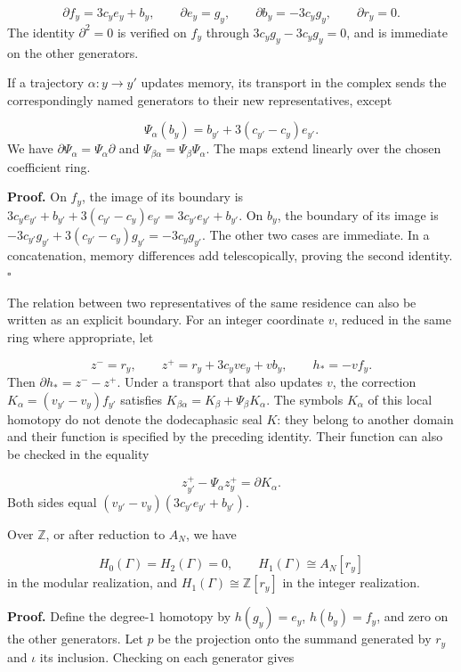 \[
\partial f_y=3c_y e_y+b_y,\qquad
\partial e_y=g_y,\qquad
\partial b_y=-3c_y g_y,\qquad
\partial r_y=0.
\]
The identity \(\partial^2=0\) is verified on \(f_y\) through \(3c_yg_y-3c_yg_y=0\), and is immediate on the other generators.

If a trajectory \(\alpha:y\to y'\) updates memory, its transport in the complex sends the correspondingly named generators to their new representatives, except

\[
\Psi_\alpha(b_y)=b_{y'}+3(c_{y'}-c_y)e_{y'}.
\]
We have \(\partial\Psi_\alpha=\Psi_\alpha\partial\) and \(\Psi_{\beta\alpha}=\Psi_\beta\Psi_\alpha\). The maps extend linearly over the chosen coefficient ring.

\textbf{Proof.} On \(f_y\), the image of its boundary is \(3c_ye_{y'}+b_{y'}+3(c_{y'}-c_y)e_{y'} =3c_{y'}e_{y'}+b_{y'}\). On \(b_y\), the boundary of its image is \(-3c_{y'}g_{y'}+3(c_{y'}-c_y)g_{y'}=-3c_yg_{y'}\). The other two cases are immediate. In a concatenation, memory differences add telescopically, proving the second identity. \hfill\(\square\)

The relation between two representatives of the same residence can also be written as an explicit boundary. For an integer coordinate \(v\), reduced in the same ring where appropriate, let

\[
z^-=r_y,\qquad z^+=r_y+3c_yv e_y+v b_y,
\qquad h_*=-vf_y.
\]
Then \(\partial h_*=z^--z^+\). Under a transport that also updates \(v\), the correction \(K_\alpha=(v_{y'}-v_y)f_{y'}\) satisfies \(K_{\beta\alpha}=K_\beta+\Psi_\beta K_\alpha\). The symbols \(K_\alpha\) of this local homotopy do not denote the dodecaphasic seal \(K\): they belong to another domain and their function is specified by the preceding identity. Their function can also be checked in the equality

\[
z^+_{y'}-\Psi_\alpha z^+_y=\partial K_\alpha.
\]
Both sides equal \((v_{y'}-v_y)(3c_{y'}e_{y'}+b_{y'})\).

Over \(\mathbb Z\), or after reduction to \(A_N\), we have

\[
H_0(\Gamma)=H_2(\Gamma)=0,
\qquad H_1(\Gamma)\cong A_N[r_y]
\]
in the modular realization, and \(H_1(\Gamma)\cong\mathbb Z[r_y]\) in the integer realization.

\textbf{Proof.} Define the degree-\(1\) homotopy by \(h(g_y)=e_y\), \(h(b_y)=f_y\), and zero on the other generators. Let \(p\) be the projection onto the summand generated by \(r_y\) and \(\iota\) its inclusion. Checking on each generator gives

